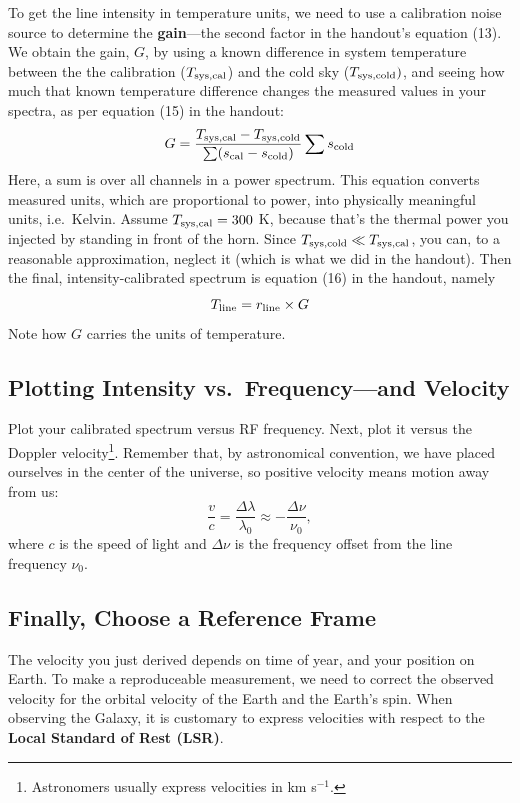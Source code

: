 \documentclass[11pt,preprint]{aastex}
\begin{document}
\noindent
To get the line intensity in temperature units, we need to use a calibration noise source
to determine the {\bf gain}---the second factor in
the handout's equation (13). We obtain the gain, $G$, by using a known
difference in system temperature between the 
the calibration ($T_{\rm sys,cal}$) and the cold sky ($T_{\rm sys,cold})$,
and seeing how much that known temperature difference changes
the measured values in your spectra,  as per equation (15)
in the handout:
%
\begin{equation}
G =
\frac{T_{\rm sys,cal} - T_{\rm sys,cold}}{\sum(s_{\rm cal} - s_{\rm cold})} 
\sum s_{\rm cold} 
\end{equation}
\noindent Here, a sum is over all channels in a power spectrum. This
equation converts measured units, which are proportional to power,
into physically meaningful units, i.e.\ Kelvin. Assume
$T_{\rm sys,cal} = 300$ K, because that's the thermal power you injected by
standing in front of the horn. Since $T_{\rm sys,cold} \ll
T_{\rm sys,cal}$, you can, to a reasonable approximation, neglect it (which is what we
did in the handout). Then the final, intensity-calibrated spectrum is
equation (16) in the handout, namely
\begin{equation}
T_{\rm line} = r_{\rm line} \times G
\end{equation}
Note how $G$ carries the units of temperature.
%
\subsection{Plotting Intensity vs.\ Frequency---and Velocity}

\noindent
Plot your calibrated spectrum versus RF frequency. Next,
plot it versus the Doppler velocity\footnote{Astronomers usually express
  velocities in km s$^{-1}$.}.  Remember that, by astronomical
convention, we have placed ourselves in the center of the universe, so positive velocity means motion away from us:
\begin{equation}
\frac{v}{c}=\frac{\Delta\lambda}{\lambda_0} \approx -\frac{\Delta \nu}{\nu_0},
\end{equation}
where $c$ is the speed of light and $\Delta \nu$ is the frequency
offset from the line frequency $\nu_0$.

\subsection{Finally, Choose a Reference Frame}

\noindent
The velocity you just derived depends on time of year, and your position on Earth.
To make a reproduceable measurement, we need
to correct the observed velocity for the orbital velocity of the Earth
and the Earth's spin. When observing the Galaxy, it is
customary to express velocities with respect to the {\bf Local Standard of
Rest (LSR)}.
\end{document}
